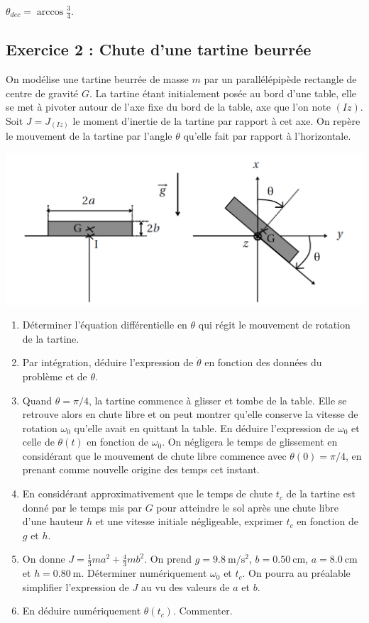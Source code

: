  $\theta_{dec} = \arccos{\frac{3}{4}}$.

\subsection{Exercice 2 : Chute d'une tartine beurrée}

On modélise une tartine beurrée de masse $m$ par un parallélépipède rectangle de centre de gravité $G$. La tartine étant initialement posée au bord d'une table, elle se met à pivoter autour de l'axe fixe du bord de la table, axe que l'on note $(Iz)$. Soit $J = J_{(Iz)}$ le moment d'inertie de la tartine par rapport à cet axe. On repère le mouvement de la tartine par l'angle $\theta$ qu'elle fait par rapport à l'horizontale.

\includegraphics[width=\textwidth]{Images/mpsi_s26_ex02.png}

\begin{enumerate}
	\item Déterminer l'équation différentielle en $\theta$ qui régit le mouvement de rotation de la tartine.
	\item Par intégration, déduire l'expression de $\dot{\theta}$ en fonction des données du problème et de $\theta$.
	\item Quand $\theta = \pi/4$, la tartine commence à glisser et tombe de la table. Elle se retrouve alors en chute libre et on peut montrer qu'elle conserve la vitesse de rotation $\omega_0$ qu'elle avait en quittant la table. En déduire l'expression de $\omega_0$ et celle de $\theta(t)$ en fonction de $\omega_0$. On négligera le temps de glissement en considérant que le mouvement de chute libre commence avec $\theta(0) = \pi/4$, en prenant comme nouvelle origine des temps cet instant.
	\item En considérant approximativement que le temps de chute $t_c$ de la tartine est donné par le temps mis par $G$ pour atteindre le sol après une chute libre d'une hauteur $h$ et une vitesse initiale négligeable, exprimer $t_c$ en fonction de $g$ et $h$.
	\item On donne $J = \frac{1}{3}ma^2 + \frac{4}{3}mb^2$. On prend $g = \SI{9.8}{\meter\per\second\squared}$, $b = \SI{0.50}{\centi\meter}$, $a = \SI{8.0}{\centi\meter}$ et $h = \SI{0.80}{\meter}$. Déterminer numériquement $\omega_0$ et $t_c$. On pourra au préalable simplifier l'expression de $J$ au vu des valeurs de $a$ et $b$.
	\item En déduire numériquement $\theta(t_c)$. Commenter.
\end{enumerate}

